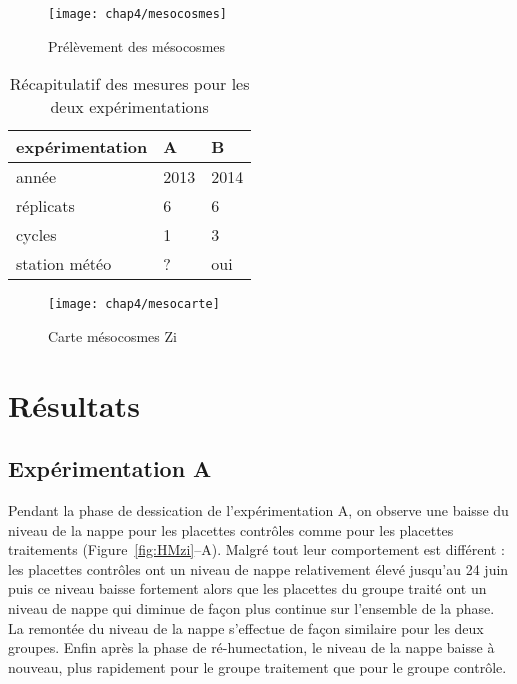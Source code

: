 \begin{figure}
\centering
\texttt{[image: chap4/mesocosmes]}
\caption{Prélèvement des mésocosmes}
\label{fig:mesophoto}
\end{figure}


\begin{table}
\centering
\caption{Récapitulatif des mesures pour les deux expérimentations}
\label{table:recap_hm}
\begin{tabular}{lll}\toprule
expérimentation & A & B \\ \midrule
année & 2013 & 2014 \\
réplicats & 6 & 6 \\
cycles & 1 & 3 \\
station météo & ? & oui\\

\bottomrule
\end{tabular}
\end{table}


\begin{figure}
\centering
\texttt{[image: chap4/mesocarte]}
\caption{Carte mésocosmes Zi}
\label{fig:mesocarte}
\end{figure}


\section{Résultats}

\subsection{Expérimentation A}

Pendant la phase de dessication de l'expérimentation A, on observe une baisse du niveau de la nappe pour les placettes contrôles comme pour les placettes traitements (Figure~\ref{fig:HMzi}--A).
Malgré tout leur comportement est différent : les placettes contrôles ont un niveau de nappe relativement élevé jusqu'au 24 juin puis ce niveau baisse fortement alors que les placettes du groupe traité ont un niveau de nappe qui diminue de façon plus continue sur l'ensemble de la phase.
La remontée du niveau de la nappe s'effectue de façon similaire pour les deux groupes.
Enfin après la phase de ré-humectation, le niveau de la nappe baisse à nouveau, plus rapidement pour le groupe traitement que pour le groupe contrôle.


